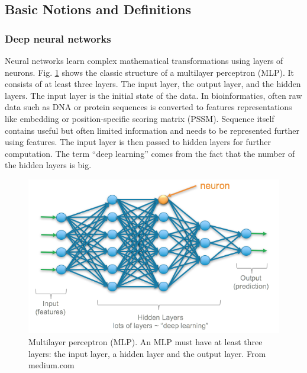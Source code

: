 \subsection{Basic Notions and Definitions}
\subsubsection{Deep neural networks}
Neural networks learn complex mathematical transformations using layers of neurons. Fig. \ref{fig_mlp} shows the classic structure of a multilayer perceptron (MLP). It consists of at least three layers. The input layer, the output layer, and the hidden layers. The input layer is the initial state of the data. In bioinformatics, often raw data such as DNA or protein sequences is converted to features representations like embedding or position-specific scoring matrix (PSSM). Sequence itself contains useful but often limited information and needs to be represented further using features. The input layer is then passed to hidden layers for further computation. The term “deep learning” comes from the fact that the number of the hidden layers is big.
\begin{figure}[h!]
\begin{center}
\includegraphics[width = 13cm]{img/multiplayer_perceptron.png}
\caption[Multilayer perceptron (MLP)]{Multilayer perceptron (MLP). An MLP must have at least three layers: the input layer, a hidden layer and the output layer. From medium.com \label{fig_mlp}}
\end{center}
\end{figure}

